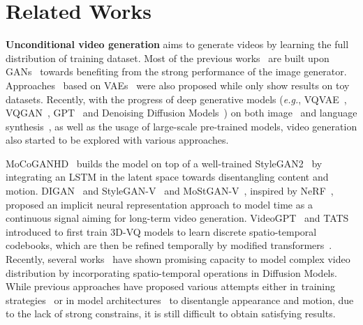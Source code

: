 \section{Related Works}
\textbf{Unconditional video generation} aims to generate videos by learning the full distribution of training dataset. Most of the previous works~\cite{vondrick2016generating,saito2017temporal,tulyakov2017mocogan,wang2020g3an,wang:tel-03551913,wang2021inmodegan,clark2019adversarial, brooks2022generating} are built upon GANs~\cite{goodfellow2014generative, radford2015unsupervised, brock2018large, karras2019style, stylegan2} towards benefiting from the strong performance of the image generator. Approaches~\cite{NIPS2017_2d2ca7ee,li2018disentangled,bhagat2020disentangling,xie2020motion} based on VAEs~\cite{kingma2013auto} were also proposed while only show results on toy datasets. 
Recently, with the progress of deep generative models (\textit{e.g.}, VQVAE~\cite{vqvae}, VQGAN~\cite{vqgan}, GPT~\cite{gpt} and Denoising Diffusion Models~\cite{ddpm, ddim, nichol2021improved}) on both image~\cite{dalle, dalle2} and language synthesis~\cite{radford2019language}, as well as the usage of large-scale pre-trained models, video generation also started to be explored with various approaches.

MoCoGANHD~\cite{mocoganhd} builds the model on top of a well-trained StyleGAN2~\cite{stylegan2} by integrating an LSTM in the latent space towards disentangling content and motion. DIGAN~\cite{digan} and StyleGAN-V~\cite{stylegan-v} and MoStGAN-V~\cite{mostgan}, inspired by NeRF~\cite{feichtenhofer2019slowfast}, proposed an implicit neural representation approach to model time as a continuous signal aiming for long-term video generation. VideoGPT~\cite{videogpt} and TATS~\cite{tats} introduced to first train 3D-VQ models to learn discrete spatio-temporal codebooks, which are then be refined temporally by modified transformers~\cite{transformer}. Recently, several works{~\cite{vdm,pvdm,videofusion}} have shown promising capacity to model complex video distribution by incorporating spatio-temporal operations in Diffusion Models. While previous approaches have proposed various attempts either in training strategies~\cite{mocoganhd,videogpt,tats} or in model architectures~\cite{wang2020g3an,wang2021inmodegan,digan,stylegan-v} to disentangle appearance and motion, due to the lack of strong constrains, it is still difficult to obtain satisfying results. 

